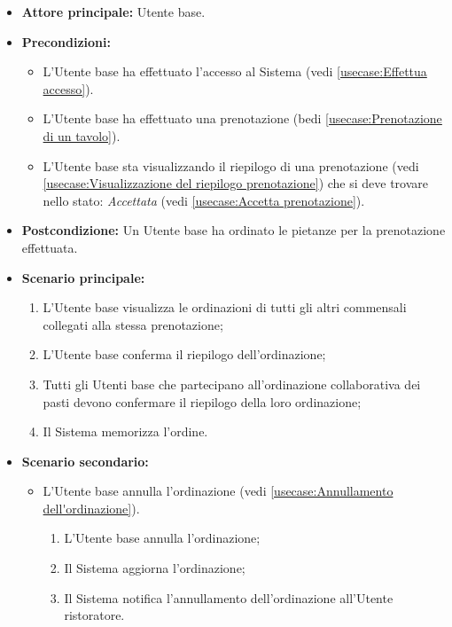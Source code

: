 \label{usecase:Creazione dell'ordinazione collaborativa dei pasti}
\begin{itemize}
	\item \textbf{Attore principale:} Utente base.

	\item \textbf{Precondizioni:}
	      \begin{itemize}
		      \item L'Utente base ha effettuato l'accesso al Sistema (vedi \autoref{usecase:Effettua accesso}).
		      \item L'Utente base ha effettuato una prenotazione (bedi \autoref{usecase:Prenotazione di un tavolo}).
		      \item L'Utente base sta visualizzando il riepilogo di una prenotazione (vedi \autoref{usecase:Visualizzazione del riepilogo prenotazione}) che si deve trovare nello stato: \textit{Accettata}  (vedi \autoref{usecase:Accetta prenotazione}).
	      \end{itemize}

	\item \textbf{Postcondizione:} Un Utente base ha ordinato le pietanze per la prenotazione effettuata.

	\item \textbf{Scenario principale:}
	      \begin{enumerate}
		      \item L'Utente base visualizza le ordinazioni di tutti gli altri commensali collegati alla stessa prenotazione;

		      \item L'Utente base conferma il riepilogo dell'ordinazione;

		      \item Tutti gli Utenti base che partecipano all'ordinazione collaborativa dei pasti devono
		            confermare il riepilogo della loro ordinazione;
		      \item Il Sistema memorizza l'ordine.
	      \end{enumerate}

	\item \textbf{Scenario secondario:}
	      \begin{itemize}
		      \item L'Utente base annulla l'ordinazione (vedi
		            \autoref{usecase:Annullamento dell'ordinazione}).
		            \begin{enumerate}
			            \item L'Utente base annulla l'ordinazione;
			            \item Il Sistema aggiorna l'ordinazione;
			            \item Il Sistema notifica l'annullamento dell'ordinazione
			                  all'Utente ristoratore.
		            \end{enumerate}
	      \end{itemize}
\end{itemize}


